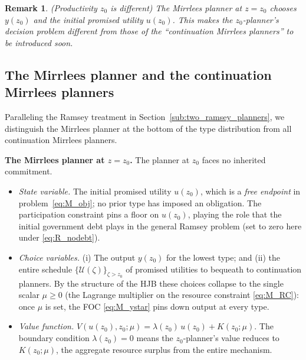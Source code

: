 \documentclass[12pt]{article}
\newtheorem{remark}{Remark}
\newcommand{\calU}{\mathcal{U}}
\newcommand{\zlow}{z_{0}}
\begin{document}
\begin{remark} (Productivity $\zlow$ is different)
The Mirrlees planner at $z = \zlow$ chooses $y(\zlow)$ and the initial promised
utility $u(\zlow)$.  This makes the $\zlow$-planner's decision problem different
from those of the ``continuation Mirrlees planners'' to be introduced soon.
\end{remark}

\subsection{The Mirrlees planner and the continuation Mirrlees planners}
\label{sub:two_mirrlees_planners}

Paralleling the Ramsey treatment in Section~\ref{sub:two_ramsey_planners}, we
distinguish the Mirrlees planner at the bottom of the type distribution from
all continuation Mirrlees planners.

\medskip
\noindent\textbf{The Mirrlees planner at $z=\zlow$.}
The planner at $\zlow$ faces no inherited commitment.
\begin{itemize}
  \item \emph{State variable.}  The initial promised utility $u(\zlow)$, which
    is a \emph{free endpoint} in problem~\eqref{eq:M_obj}; no prior type has
    imposed an obligation.  The participation constraint pins a floor on
    $u(\zlow)$, playing the role that the initial government debt plays in the
    general Ramsey problem (set to zero here under \eqref{eq:R_nodebt}).
  \item \emph{Choice variables.}  (i) The output $y(\zlow)$ for the lowest
    type; and (ii) the entire schedule $\{\calU(\zeta)\}_{\zeta>\zlow}$ of
    promised utilities to bequeath to continuation planners.  By the structure
    of the HJB these choices collapse to the single scalar $\mu\ge 0$ (the
    Lagrange multiplier on the resource constraint \eqref{eq:M_RC}): once
    $\mu$ is set, the FOC \eqref{eq:M_ystar} pins down output at every type.
  \item \emph{Value function.} $V(u(\zlow),\zlow;\mu) = \lambda(\zlow)\,u(\zlow)
    + K(\zlow;\mu)$.  The boundary condition $\lambda(\zlow)=0$ means the
    $\zlow$-planner's value reduces to $K(\zlow;\mu)$, the aggregate resource
    surplus from the entire mechanism.
\end{itemize}
\end{document}
